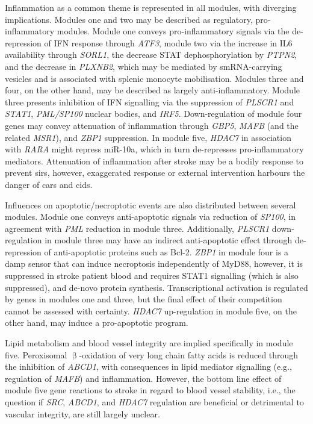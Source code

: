 Inflammation as a common theme is represented in all modules, with diverging implications. Modules one and two may be described as regulatory, pro-inflammatory modules. Module one conveys pro-inflammatory signals via the de-repression of IFN response through \emph{ATF3}, module two via the increase in IL6 availability through \emph{SORL1}, the decrease STAT dephosphorylation by \emph{PTPN2}, and the decrease in \emph{PLXNB2}, which may be mediated by smRNA-carrying vesicles and is associated with splenic monocyte mobilisation. Modules three and four, on the other hand, may be described as largely anti-inflammatory. Module three presents inhibition of IFN signalling via the suppression of \emph{PLSCR1} and \emph{STAT1}, \emph{PML/SP100} nuclear bodies, and \emph{IRF5}. Down-regulation of module four genes may convey attenuation of inflammation through \emph{GBP5}, \emph{MAFB} (and the related \emph{MSR1}), and \emph{ZBP1} suppression. In module five, \emph{HDAC7} in association with \emph{RARA} might repress miR-10a, which in turn de-represses pro-inflammatory mediators. Attenuation of inflammation after stroke may be a bodily response to prevent \acf{sirs}, however, exaggerated response or external intervention harbours the danger of \acf{cars} and \acf{cids}.

Influences on apoptotic/necroptotic events are also distributed between several modules. Module one conveys anti-apoptotic signals via reduction of \emph{SP100}, in agreement with \emph{PML} reduction in module three. Additionally, \emph{PLSCR1} down-regulation in module three may have an indirect anti-apoptotic effect through de-repression of anti-apoptotic proteins such as Bcl-2. \emph{ZBP1} in module four is a \ac{damp} sensor that can induce necroptosis independently of MyD88, however, it is suppressed in stroke patient blood and requires STAT1 signalling (which is also suppressed), and de-novo protein synthesis. Transcriptional activation is regulated by genes in modules one and three, but the final effect of their competition cannot be assessed with certainty. \emph{HDAC7} up-regulation in module five, on the other hand, may induce a pro-apoptotic program.

Lipid metabolism and blood vessel integrity are implied specifically in module five. Peroxisomal $\upbeta$-oxidation of very long chain fatty acids is reduced through the inhibition of \emph{ABCD1}, with consequences in lipid mediator signalling (e.g., regulation of \emph{MAFB}) and inflammation. However, the bottom line effect of module five gene reactions to stroke in regard to blood vessel stability, i.e., the question if \emph{SRC}, \emph{ABCD1}, and \emph{HDAC7} regulation are beneficial or detrimental to vascular integrity, are still largely unclear.

